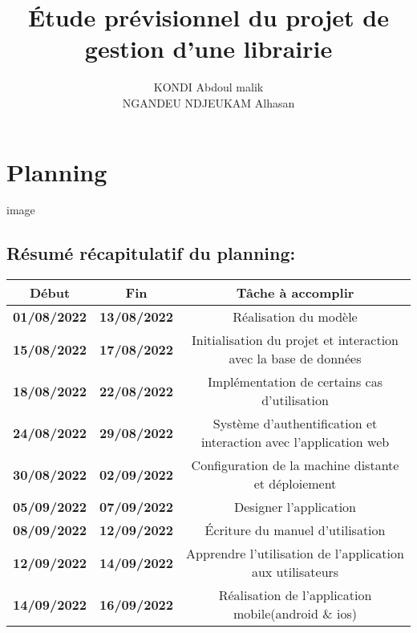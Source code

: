 \documentclass[12pt,a4paper]{article}
\author{KONDI Abdoul malik \\ NGANDEU NDJEUKAM Alhasan}
\title{Étude prévisionnel du projet de gestion d'une librairie}
\begin{document}
\maketitle
\tableofcontents
\newpage

\section{Planning}

image

\subsection{Résumé récapitulatif du planning:}
\begin{flushleft}

\begin{tabular}{|c|c|c|}
\hline 
Début & Fin & Tâche à accomplir \\ 
\hline 
\textbf{01/08/2022} & \textbf{13/08/2022} & Réalisation du modèle \\ 
\hline 
\textbf{15/08/2022} & \textbf{17/08/2022} & Initialisation du projet et interaction avec la base de données \\ 
\hline
\textbf{18/08/2022} & \textbf{22/08/2022} & Implémentation de certains cas d'utilisation \\ 
\hline 
\textbf{24/08/2022} & \textbf{29/08/2022} & Système d'authentification et interaction avec l'application web\\ 
\hline
\textbf{30/08/2022} & \textbf{02/09/2022} & Configuration de la machine distante et déploiement\\ 
\hline 
\textbf{05/09/2022} & \textbf{07/09/2022} & Designer l'application \\ 
\hline 
\textbf{08/09/2022} & \textbf{12/09/2022} & Écriture du manuel d'utilisation \\ 
\hline
\textbf{12/09/2022} & \textbf{14/09/2022} & Apprendre l'utilisation de l'application aux utilisateurs \\ 
\hline  
\textbf{14/09/2022} & \textbf{16/09/2022} & Réalisation de l'application mobile(android \& ios) \\ 
\hline 
 

\end{tabular} 
\end{flushleft}
\end{document}
